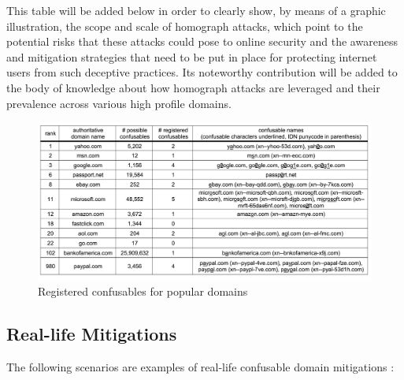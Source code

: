 This table will be added below in order to clearly show, by means of a graphic illustration, the scope and scale of homograph attacks, which point to the potential risks that these attacks could pose to online security and the awareness and mitigation strategies that need to be put in place for protecting internet users from such deceptive practices. Its noteworthy contribution will be added to the body of knowledge about how homograph attacks are leveraged and their prevalence across various high profile domains.



\captionsetup{font= footnotesize}
\begin{figure}[H]
    \centering
    \includegraphics[width=1\linewidth]{evaluation/confusable.png}
    \caption{Registered confusables for popular domains}
    \label{fig:figureAlot1}
\end{figure}

\subsection{ Real-life Mitigations}

The following scenarios are examples of real-life confusable domain mitigations :


